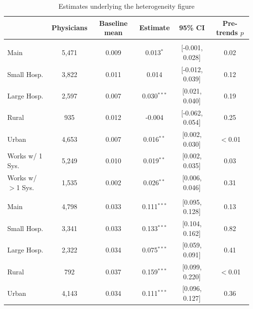 \begin{table}[!h]
\centering
\caption{\label{tab:heterog_appendix}Estimates underlying the heterogeneity figure}
\centering
\begin{threeparttable}
\begin{tabular}[t]{lccccc}
\toprule
 & Physicians & Baseline mean & Estimate & 95\% CI & Pre-trends $p$\\
\midrule
\addlinespace[0.3em]
\multicolumn{6}{l}{\textbf{Exit}}\\
\hspace{1em}\quad Main & 5,471 & 0.009 & 0.013$^{*}$ & {}[-0.001, 0.028] & 0.02\\
\hspace{1em}\quad Small Hosp. & 3,822 & 0.011 & 0.014 & {}[-0.012, 0.039] & 0.12\\
\hspace{1em}\quad Large Hosp. & 2,597 & 0.007 & 0.030$^{***}$ & {}[0.021, 0.040] & 0.19\\
\hspace{1em}\quad Rural & 935 & 0.012 & -0.004 & {}[-0.062, 0.054] & 0.25\\
\hspace{1em}\quad Urban & 4,653 & 0.007 & 0.016$^{**}$ & {}[0.002, 0.030] & $<$0.01\\
\hspace{1em}\quad Works w/ 1 Sys. & 5,249 & 0.010 & 0.019$^{**}$ & {}[0.002, 0.035] & 0.03\\
\hspace{1em}\quad Works w/ $>$1 Sys. & 1,535 & 0.002 & 0.026$^{**}$ & {}[0.006, 0.046] & 0.31\\
\addlinespace[0.3em]
\multicolumn{6}{l}{\textbf{Frac. in Office}}\\
\hspace{1em}\quad Main & 4,798 & 0.033 & 0.111$^{***}$ & {}[0.095, 0.128] & 0.13\\
\hspace{1em}\quad Small Hosp. & 3,341 & 0.033 & 0.133$^{***}$ & {}[0.104, 0.162] & 0.82\\
\hspace{1em}\quad Large Hosp. & 2,322 & 0.034 & 0.075$^{***}$ & {}[0.059, 0.091] & 0.41\\
\hspace{1em}\quad Rural & 792 & 0.037 & 0.159$^{***}$ & {}[0.099, 0.220] & $<$0.01\\
\hspace{1em}\quad Urban & 4,143 & 0.034 & 0.111$^{***}$ & {}[0.096, 0.127] & 0.36\\

\end{tabular}
\end{threeparttable}
\end{table}
